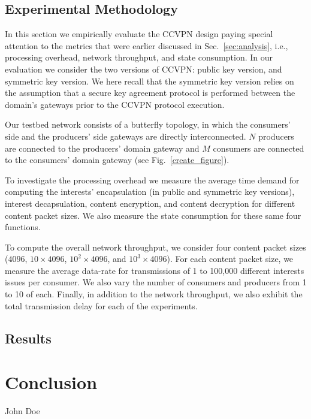 \documentclass[conference,letterpaper,10pt]{IEEEtran}
\begin{document}
\subsection{Experimental Methodology}

In this section we empirically evaluate the CCVPN design paying special attention to the metrics that were earlier discussed in Sec.~\ref{sec:analysis}, i.e., processing overhead, network throughput, and state consumption. In our evaluation we consider the two versions of CCVPN: public key version, and symmetric key version. We here recall that the symmetric key version relies on the assumption that a secure key agreement protocol is performed between the domain's gateways prior to the CCVPN protocol execution.

Our testbed network consists of a butterfly topology, in which the consumers' side and the producers' side gateways are directly interconnected. $N$ producers are connected to the producers' domain gateway and $M$ consumers are connected to the consumers' domain gateway (see Fig.~\ref{create_figure}).

To investigate the processing overhead we measure the average time demand for computing the interests' encapsulation (in public and symmetric key versions), interest decapsulation, content encryption, and content decryption for different content packet sizes. We also measure the state consumption for these same four functions.

To compute the overall network throughput, we consider four content packet sizes ($4096$, $10 \times 4096$, $10^2 \times 4096$, and $10^3 \times 4096$). For each content packet size, we measure the average data-rate for transmissions of 1 to 100,000 different interests issues per consumer. We also vary the number of consumers and producers from 1 to 10 of each. Finally, in addition to the network throughput, we also exhibit the total transmission delay for each of the experiments.

\subsection{Results}

\section{Conclusion}\label{conclusion}


\ifCLASSOPTIONcaptionsoff
  \newpage
\fi

\tiny



\begin{IEEEbiography}{John Doe}
\blindtext
\end{IEEEbiography}
\end{document}
